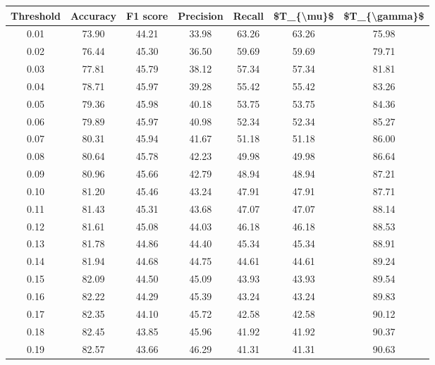 \begin{tabular}{|c|c|c|c|c|c|c|}
\hline
 Threshold &  Accuracy &  F1 score &  Precision &  Recall &  \$T\_\{\textbackslash mu\}\$ &  \$T\_\{\textbackslash gamma\}\$ \\
\hline
      0.01 &     73.90 &     44.21 &      33.98 &   63.26 &      63.26 &         75.98 \\
      0.02 &     76.44 &     45.30 &      36.50 &   59.69 &      59.69 &         79.71 \\
      0.03 &     77.81 &     45.79 &      38.12 &   57.34 &      57.34 &         81.81 \\
      0.04 &     78.71 &     45.97 &      39.28 &   55.42 &      55.42 &         83.26 \\
      0.05 &     79.36 &     45.98 &      40.18 &   53.75 &      53.75 &         84.36 \\
      0.06 &     79.89 &     45.97 &      40.98 &   52.34 &      52.34 &         85.27 \\
      0.07 &     80.31 &     45.94 &      41.67 &   51.18 &      51.18 &         86.00 \\
      0.08 &     80.64 &     45.78 &      42.23 &   49.98 &      49.98 &         86.64 \\
      0.09 &     80.96 &     45.66 &      42.79 &   48.94 &      48.94 &         87.21 \\
      0.10 &     81.20 &     45.46 &      43.24 &   47.91 &      47.91 &         87.71 \\
      0.11 &     81.43 &     45.31 &      43.68 &   47.07 &      47.07 &         88.14 \\
      0.12 &     81.61 &     45.08 &      44.03 &   46.18 &      46.18 &         88.53 \\
      0.13 &     81.78 &     44.86 &      44.40 &   45.34 &      45.34 &         88.91 \\
      0.14 &     81.94 &     44.68 &      44.75 &   44.61 &      44.61 &         89.24 \\
      0.15 &     82.09 &     44.50 &      45.09 &   43.93 &      43.93 &         89.54 \\
      0.16 &     82.22 &     44.29 &      45.39 &   43.24 &      43.24 &         89.83 \\
      0.17 &     82.35 &     44.10 &      45.72 &   42.58 &      42.58 &         90.12 \\
      0.18 &     82.45 &     43.85 &      45.96 &   41.92 &      41.92 &         90.37 \\
      0.19 &     82.57 &     43.66 &      46.29 &   41.31 &      41.31 &         90.63 \\

\end{tabular}
